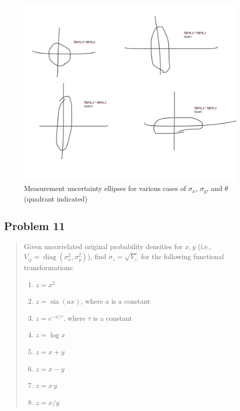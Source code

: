 \documentclass[10pt]{article}
\begin{document}
\begin{figure}
	\centering
	\includegraphics[width=\textwidth]{set1-p10.png}
	\caption{Measurement uncertainty ellipses for various cases of $\sigma_x$, $\sigma_y$, and $\theta$ (quadrant indicated)}
	\label{fig:ellipses}
\end{figure}



\subsection*{Problem 11}
\begin{quote}
	Given uncorrelated original probability densities for $x,y$ (i.e., $V_{ij}=\operatorname{diag}(\sigma_x^2,\sigma_y^2)$), find $\sigma_z=\sqrt{V_z}$ for the following functional transformations:
	\begin{enumerate}[label=(\alph*)]
		\item $z=x^2$
		\item $z=\sin(a x)$, where $a$ is a constant
		\item $z=e^{-x/\tau}$, where $\tau$ is a constant
		\item $z=\log x$
		\item $z=x+y$
		\item $z=x-y$
		\item $z=x\,y$
		\item $z=x/y$
	\end{enumerate}
\end{quote}
\end{document}
